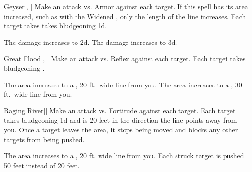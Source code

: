 \lowercase{\hypertarget{spell:Geyser}{}}\label{spell:Geyser}
\begin{freeability}[Rank 3]{\hypertarget{spell:Geyser}{Geyser}}[, ]
Make an attack vs. Armor against each target.
If this spell has its area increased, such as with the Widened , only the length of the line increases.
\hit Each target takes takes bludgeoning  \plus1d.

\rankline
{} The damage increases to  \plus2d.
 The damage increases to  \plus3d.
\end{freeability}
\vspace{0.25em}



\lowercase{\hypertarget{spell:Great Flood}{}}\label{spell:Great Flood}
\begin{freeability}[Rank 3]{\hypertarget{spell:Great Flood}{Great Flood}}[, ]
Make an attack vs. Reflex against each target.
\hit Each target takes bludgeoning .

\rankline
{} The area increases to a \areahuge, 20 ft.\ wide line from you.
 The area increases to a \areaext, 30 ft.\ wide line from you.
\end{freeability}
\vspace{0.25em}



\lowercase{\hypertarget{spell:Raging River}{}}\label{spell:Raging River}
\begin{freeability}[Rank 3]{\hypertarget{spell:Raging River}{Raging River}}[]
Make an attack vs. Fortitude against each target.
\hit Each target takes bludgeoning  \minus1d and is  20 feet in the direction the line points away from you.
Once a target leaves the area, it stops being moved and blocks any other targets from being pushed.

\rankline
 The area increases to a \areahuge, 20 ft. wide line from you.
 Each struck target is pushed 50 feet instead of 20 feet.
\end{freeability}
\vspace{0.25em}



